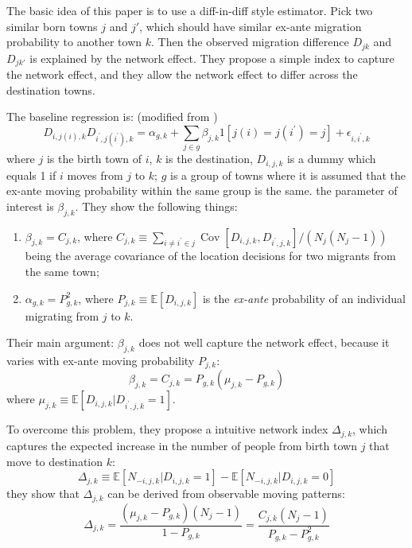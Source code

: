 \textbf{}


The basic idea of this paper is to use a diff-in-diff style estimator.
Pick two similar born towns $j$ and $j'$, which should have similar ex-ante migration probability to another town $k$.
Then the observed migration difference $D_{jk}$ and $D_{jk'}$ is explained by the network effect. 
They propose a simple index to capture the network effect, and they allow the network effect to differ across the destination towns.

The baseline regression is: (modified from \cite{BayerRossTopa2008})
\[
    D_{i, j(i), k} D_{i^{\prime}, j\left(i^{\prime}\right), k}=\alpha_{g, k}+\sum_{j \in g} \beta_{j, k} 1\left[j(i)=j\left(i^{\prime}\right)=j\right]+\epsilon_{i, i^{\prime}, k}
\]
where $j$ is the birth town of $i$, $k$ is the destination, $D_{i,j,k}$ is a dummy which equals 1 if $i$ moves from $j$ to $k$; $g$ is a group of towns where it is assumed that the ex-ante moving probability within the same group is the same.
the parameter of interest is $\beta_{j,k}$.
They show the following things:
\begin{enumerate}
    \item $\beta_{j,k} = C_{j,k}$, where $C_{j, k} \equiv \sum_{i \neq i^{\prime} \in j} \operatorname{Cov}\left[D_{i, j, k}, D_{i^{\prime}, j, k}\right] /\left(N_{j}\left(N_{j}-1\right)\right)$ being the average covariance of the location decisions for two migrants from the same town;
    \item $\alpha_{g,k} = P^2_{g,k}$, where $P_{j, k} \equiv \mathbb{E}\left[D_{i, j, k}\right]$ is the \textit{ex-ante} probability of an individual migrating from $j$ to $k$.
\end{enumerate}
Their main argument: $\beta_{j,k}$ does not well capture the network effect, because it varies with ex-ante moving probability $P_{j,k}$:
\[
    \beta_{j,k} = C_{j,k} = P_{g,k}(\mu_{j,k} - P_{g,k})
\]
where $\mu_{j, k} \equiv \mathbb{E}\left[D_{i, j, k} | D_{i^{\prime}, j, k}=1\right]$.


To overcome this problem, they propose a intuitive network index $\Delta_{j,k}$, which captures the expected increase in the number of people from birth town $j$ that move to destination $k$:
\[
    \Delta_{j, k} \equiv \mathbb{E}\left[N_{-i, j, k} | D_{i, j, k}=1\right]-\mathbb{E}\left[N_{-i, j, k} | D_{i, j, k}=0\right]
\]
they show that $\Delta_{j,k}$ can be derived from observable moving patterns:
\[
    \Delta_{j, k}=\frac{\left(\mu_{j, k}-P_{g, k}\right)\left(N_{j}-1\right)}{1-P_{g, k}}=\frac{C_{j, k}\left(N_{j}-1\right)}{P_{g, k}-P_{g, k}^{2}}
\]

